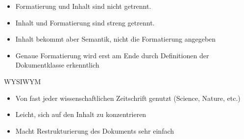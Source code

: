 


\begin{frame}
	\begin{description}
		\item<1,2>[WYSIWYG]
		\begin{itemize}
			\item<2>{Formatierung und Inhalt sind nicht getrennt.}
		\end{itemize}
		\item<3-6>[WYSIWYM]
		\begin{itemize}
			\item<4>{Inhalt und Formatierung sind streng getrennt.}
			\item<5>{Inhalt bekommt aber Semantik, nicht die Formatierung angegeben}
			\item<6>{Genaue Formatierung wird erst am Ende durch Definitionen der Dokumentklasse erkenntlich}
		\end{itemize}
	\end{description}
\end{frame}

\begin{frame}{WYSIWYM}
	\begin{itemize}[<+-|alert@+>]
		\item Von fast jeder wissenschaftlichen Zeitschrift genutzt (Science, Nature, etc.)
		\item Leicht, sich auf den Inhalt zu konzentrieren
        \item Macht Restrukturierung des Dokuments sehr einfach
	\end{itemize}
\end{frame}
